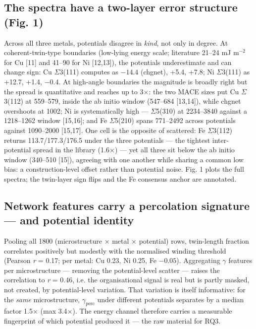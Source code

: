 \documentclass[12pt]{article}
\begin{document}
\subsection{The spectra have a two-layer error structure (Fig. 1)}

Across all three metals, potentials disagree in \textit{kind}, not only in degree. At coherent-twin-type boundaries (low-lying energy scale; literature 21--24 mJ m$^{-2}$ for Cu [11] and 41--90 for Ni [12,13]), the potentials underestimate and can change sign: Cu $\Sigma$3(111) computes as $-14.4$ (chgnet), +5.4, +7.8; Ni $\Sigma$3(111) as +12.7, +1.4, $-0.4$. At high-angle boundaries the magnitude is broadly right but the spread is quantitative and reaches up to 3$\times$: the two MACE sizes put Cu $\Sigma$3(112) at 559--579, inside the ab initio window (547--684 [13,14]), while chgnet overshoots at 1002; Ni is systematically high --- $\Sigma$5(310) at 2234--3840 against a 1218--1262 window [15,16]; and Fe $\Sigma$5(210) spans 771--2492 across potentials against 1090--2000 [15,17]. One cell is the opposite of scattered: Fe $\Sigma$3(112) returns 113.7/177.3/176.5 under the three potentials --- the tightest inter-potential spread in the library (1.6$\times$) --- yet all three sit below the ab initio window (340--510 [15]), agreeing with one another while sharing a common low bias: a construction-level offset rather than potential noise. Fig. 1 plots the full spectra; the twin-layer sign flips and the Fe consensus anchor are annotated.

\subsection{Network features carry a percolation signature --- and potential identity}

Pooling all 1800 (microstructure $\times$ metal $\times$ potential) rows, twin-length fraction correlates positively but modestly with the normalised winding threshold (Pearson \textit{r} = 0.17; per metal: Cu 0.23, Ni 0.25, Fe $-0.05$). Aggregating $\gamma$ features per microstructure --- removing the potential-level scatter --- raises the correlation to \textit{r} = 0.46, i.e. the organisational signal is real but is partly masked, not created, by potential-level variation. That variation is itself informative: for the \textit{same} microstructure, $\gamma_{\mathrm{perc}}$ under different potentials separates by a median factor 1.5$\times$ (max 3.4$\times$). The energy channel therefore carries a measurable fingerprint of which potential produced it --- the raw material for RQ3.
\end{document}
